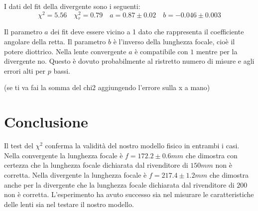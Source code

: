 \documentclass[a4paper,10pt]{article}
\begin{document}
I dati del fit della divergente sono i seguenti:
\begin{equation} 
\chi^2= 5.56 \quad \chi^2_r=0.79 \quad a=0.87\pm 0.02 \quad	b=-0.046\pm0.003
\end{equation}

Il parametro $a$ dei fit deve essere vicino a 1 dato che rappresenta il coefficiente angolare della retta. Il parametro $b$ è l'inverso della lunghezza focale, cioè il potere diottrico. Nella lente convergente $a$ è compatibile con $1$ mentre per la divergente no. Questo è dovuto probabilmente al ristretto numero di misure e agli errori alti per $p$ bassi.

(se ti va fai la somma del chi2 aggiungendo l'errore sulla x a mano)
\section{Conclusione}
Il test del $\chi^2$ conferma la validità del nostro modello fisico in entrambi i casi.
Nella convergente la lunghezza focale è $f=172.2\pm0.6mm$ che dimostra con certezza che la lunghezza focale dichiarata dal rivenditore di $150mm$ non  è corretta.
Nella divergente la lunghezza focale è $f=217.4\pm1.2mm$ che dimostra anche per la divergente che la lunghezza focale dichiarata dal rivenditore di $200$ non è corretta.
L'esperimento ha avuto successo sia nel misurare le caratteristiche delle lenti sia nel testare il nostro modello.
\end{document}
